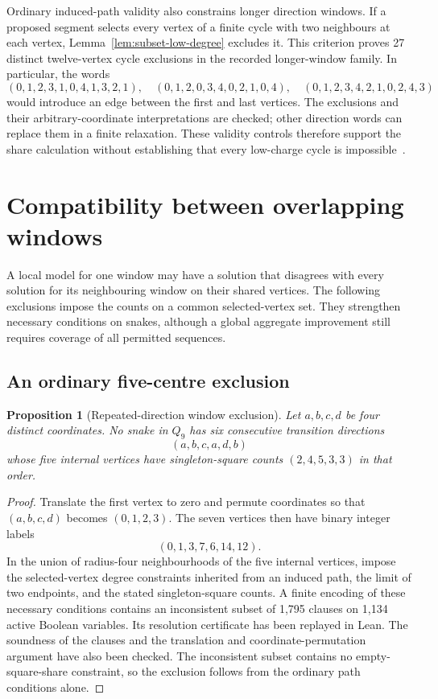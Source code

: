 \documentclass[11pt,a4paper]{article}
\newtheorem{proposition}[theorem]{Proposition}
\theoremstyle{definition}
\theoremstyle{remark}
\newcommand{\Q}{Q}
\begin{document}
Ordinary induced-path validity also constrains longer direction windows. If a proposed segment selects every vertex of a finite cycle with two neighbours at each vertex, Lemma~\ref{lem:subset-low-degree} excludes it. This criterion proves 27 distinct twelve-vertex cycle exclusions in the recorded longer-window family. In particular, the words
\[
(0,1,2,3,1,0,4,1,3,2,1),\quad
(0,1,2,0,3,4,0,2,1,0,4),\quad
(0,1,2,3,4,2,1,0,2,4,3)
\]
would introduce an edge between the first and last vertices. The exclusions and their arbitrary-coordinate interpretations are checked; other direction words can replace them in a finite relaxation. These validity controls therefore support the share calculation without establishing that every low-charge cycle is impossible~\cite{geometricarchive}.

\section{Compatibility between overlapping windows}\label{sec:compatibility}
A local model for one window may have a solution that disagrees with every solution for its neighbouring window on their shared vertices. The following exclusions impose the counts on a common selected-vertex set. They strengthen necessary conditions on snakes, although a global aggregate improvement still requires coverage of all permitted sequences.

\subsection{An ordinary five-centre exclusion}\label{sec:direct-share}
\begin{proposition}[Repeated-direction window exclusion]\label{prop:share-window-exclusion}
Let $a,b,c,d$ be four distinct coordinates. No snake in $\Q_9$ has six consecutive transition directions
\[
(a,b,c,a,d,b)
\]
whose five internal vertices have singleton-square counts $(2,4,5,3,3)$ in that order.
\end{proposition}
\begin{proof}
Translate the first vertex to zero and permute coordinates so that $(a,b,c,d)$ becomes $(0,1,2,3)$. The seven vertices then have binary integer labels
\[
(0,1,3,7,6,14,12).
\]
In the union of radius-four neighbourhoods of the five internal vertices, impose the selected-vertex degree constraints inherited from an induced path, the limit of two endpoints, and the stated singleton-square counts. A finite encoding of these necessary conditions contains an inconsistent subset of 1,795 clauses on 1,134 active Boolean variables. Its resolution certificate has been replayed in Lean. The soundness of the clauses and the translation and coordinate-permutation argument have also been checked. The inconsistent subset contains no empty-square-share constraint, so the exclusion follows from the ordinary path conditions alone.
\end{proof}
\end{document}
